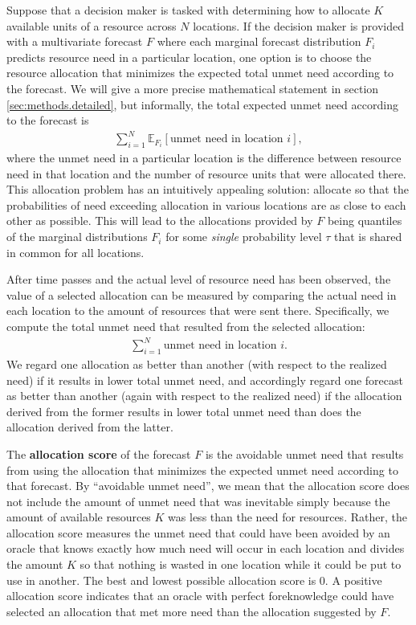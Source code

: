 \documentclass{article}
\begin{document}
Suppose that a decision maker is tasked with determining how to allocate $K$ available units of a resource across $N$
locations. If the decision maker is provided with a multivariate forecast $F$ where each marginal forecast distribution
$F_i$ predicts resource need in a particular location, one option is to choose the resource allocation that minimizes
the expected total unmet need according to the forecast. We will give a more precise mathematical statement in section
\ref{sec:methods.detailed}, but informally, the total expected unmet need according to the forecast is
\begin{align}
\sum_{i=1}^N \mathbb{E}_{F_i}[\text{unmet need in location $i$}], \label{eqn:informal_objective}
\end{align}
where the unmet need in a particular location is the difference between resource need in that location and the number of
resource units that were allocated there. This allocation problem has an intuitively appealing solution: allocate so that the
probabilities of need exceeding allocation in various locations are as close to each other as possible. This will lead
to the allocations provided by $F$ being quantiles of the marginal distributions $F_i$ for some \emph{single}
probability level $\tau$ that is shared in common for all locations.

After time passes and the actual level of resource need has been observed, the value of a selected allocation can be
measured by comparing the actual need in each location to the amount of resources that were sent there. Specifically, we
compute the total unmet need that resulted from the selected allocation:
\begin{align}
    \sum_{i=1}^N \text{unmet need in location $i$}. \label{eqn:informal_loss}
\end{align}
We regard one allocation as better than another (with respect to the realized need) if it results in lower total 
unmet need, and accordingly regard one forecast as better than another (again with respect to the realized need)
if the allocation derived from the former results in lower total unmet need than does the allocation derived from the 
latter.

The \textbf{allocation score} of the forecast $F$ is the avoidable unmet need that results from using the allocation
that minimizes the expected unmet need according to that forecast. By ``avoidable unmet need'', we mean that the
allocation score does not include the amount of unmet need that was inevitable simply because the amount of available
resources $K$ was less than the need for resources. Rather, the allocation score measures the unmet need that could have
been avoided by an oracle that knows exactly how much need will occur in each location and divides the amount $K$ so
that nothing is wasted in one location while it could be put to use in another. The best and lowest possible allocation 
score is 0.  A positive allocation score indicates that an oracle with perfect foreknowledge could have selected an allocation 
that met more need than the allocation suggested by $F$.
\end{document}
